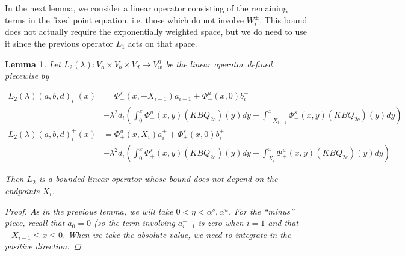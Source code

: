 \documentclass[12pt]{article}
\newtheorem{lemma}{Lemma}
\begin{document}
In the next lemma, we consider a linear operator consisting of the remaining terms in the fixed point equation, i.e. those which do not involve $W_i^\pm$. This bound does not actually require the exponentially weighted space, but we do need to use it since the previous operator $L_1$ acts on that space.

\begin{lemma}

Let $L_2(\lambda): V_a \times V_b \times V_d \rightarrow V_w^\eta$ be the linear operator defined piecewise by

\begin{align*}
L_2(\lambda)(a, b, d)_i^-(x) &= \Phi^s_-(x, -X_{i-1})a^-_{i-1} + \Phi^u_-(x, 0)b_i^- \\
&- \lambda^2 d_i \left( \int_0^x \Phi^u_-(x, y)(KBQ_{2c})(y) dy  + \int_{-X_{i-1}}^x \Phi^s_-(x, y)(KBQ_{2c})(y) dy \right)\\
L_2(\lambda)(a, b, d)_i^+(x) &= \Phi^u_+(x, X_i)a^+_{i} + \Phi^s_+(x, 0)b_i^+ \\
&- \lambda^2 d_i \left( \int_0^x \Phi^s_+(x, y)(KBQ_{2c})(y) dy + \int_{X_{i}}^x \Phi^u_+(x, y)(KBQ_{2c})(y) dy \right)
\end{align*}

Then $L_2$ is a bounded linear operator whose bound does not depend on the endpoints $X_i$.

\begin{proof}

As in the previous lemma, we will take $0 < \eta < \alpha^s, \alpha^u$. For the ``minus'' piece, recall that $a_0 = 0$ (so the term involving $a^-_{i-1}$ is zero when $i = 1$ and that $-X_{i-1} \leq x \leq 0$. When we take the absolute value, we need to integrate in the positive direction.


\end{proof}
\end{lemma}
\end{document}
